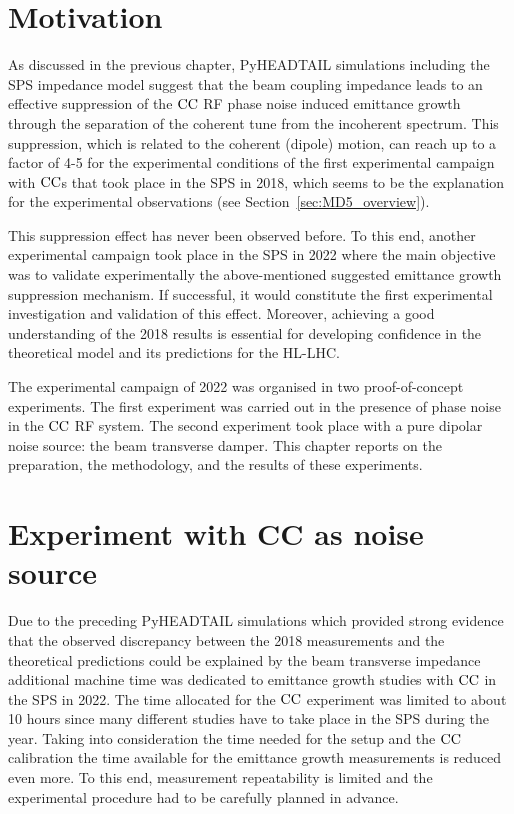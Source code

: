 \section{Motivation}\label{sec:motivation_md_2022}
As discussed in the previous chapter, PyHEADTAIL simulations including the SPS impedance model suggest that the beam coupling impedance leads to an effective suppression of the ${\mathrm{CC}}$ RF phase noise induced emittance growth through the separation of the coherent tune from the incoherent spectrum. This suppression, which is related to the coherent (dipole) motion, can reach up to a factor of 4-5 for the experimental conditions of the first experimental campaign with ${\mathrm{CC}}$s that took place in the SPS in 2018, which seems to be the explanation for the experimental observations (see Section~\ref{sec:MD5_overview}).

This suppression effect has never been observed before. To this end, another experimental campaign took place in the SPS in 2022 where the main objective was to validate experimentally the above-mentioned suggested emittance growth suppression mechanism. If successful, it would constitute the first experimental investigation and validation of this effect. Moreover, achieving a good understanding of the 2018 results is essential for developing confidence in the theoretical model and its predictions for the HL-LHC.

The experimental campaign of 2022 was organised in two proof-of-concept experiments. The first experiment was carried out in the presence of phase noise in the ${\mathrm{CC}}$ RF system. The second experiment took place with a pure dipolar noise source: the beam transverse damper. This chapter reports on the preparation, the methodology, and the results of these experiments.

\section{Experiment with CC as noise source}\label{sec:cc_md_2022}
Due to the preceding PyHEADTAIL simulations which provided strong evidence that the observed discrepancy between the 2018 measurements and the theoretical predictions could be explained by the beam transverse impedance additional machine time was dedicated to emittance growth studies with ${\mathrm{CC}}$ in the SPS in 2022. The time allocated for the ${\mathrm{CC}}$ experiment was limited to about 10 hours since many different studies have to take place in the SPS during the year. Taking into consideration the time needed for the setup and the ${\mathrm{CC}}$ calibration the time available for the emittance growth measurements is reduced even more. To this end, measurement repeatability is limited and the experimental procedure had to be carefully planned in advance.

